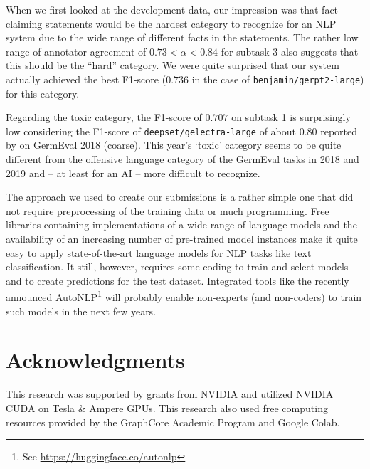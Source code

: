 \documentclass[11pt,a4paper]{article}
\begin{document}
When we first looked at the development data, our impression was that fact-claiming statements would be the 
hardest category to recognize for an NLP system due to the wide range of different facts in the statements. 
The rather low range of annotator agreement of $0.73 < \alpha < 0.84$ for subtask 3 also suggests that this 
should be the ``hard'' category. We were quite surprised that our system actually achieved the best F1-score
($0.736$ in the case of \texttt{benjamin/gerpt2-large}) for this category. 

Regarding the toxic category, the F1-score of $0.707$ on subtask 1 is surprisingly low considering the 
F1-score of \texttt{deepset/gelectra-large} of about $0.80$ reported by \citet{GNLM} on 
GermEval 2018 (coarse).  This year's `toxic' category seems to be quite different from the offensive language category 
of the GermEval tasks in 2018 and 2019 and -- at least for an AI -- more difficult to recognize.

The approach we used to create our submissions is a rather simple one that did not require preprocessing of the training 
data or much programming.
Free libraries containing implementations of a wide range of language models and the availability 
of an increasing number of pre-trained model instances make it quite easy to apply state-of-the-art language models for 
NLP tasks like text classification. 
It still, however, requires some coding to train and select models and to create predictions for the test dataset.
Integrated tools like the recently announced 
AutoNLP\footnote{See \url{https://huggingface.co/autonlp}} will probably enable non-experts (and non-coders) to train such 
models in the next few years.

\section*{Acknowledgments}
This research was supported by grants from NVIDIA and utilized NVIDIA CUDA on Tesla \& Ampere GPUs.
This research also used free computing resources provided by the GraphCore Academic Program and Google Colab.




\end{document}
